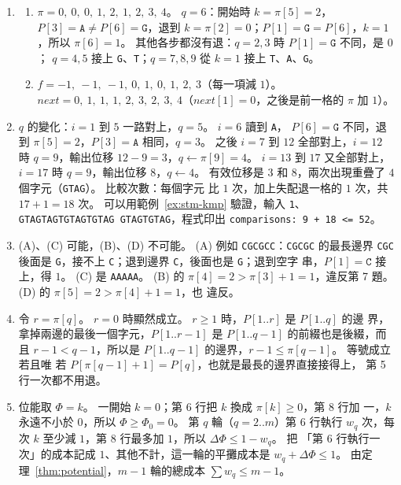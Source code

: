 \begin{enumerate}
\item
\begin{enumerate}
\item $\pi = 0,\ 0,\ 0,\ 1,\ 2,\ 1,\ 2,\ 3,\ 4$。 $q = 6$：開始時 $k = \pi[5] = 2$，$P[3] = \mathtt{A} \ne
P[6] = \mathtt{G}$，退到 $k = \pi[2] = 0$；$P[1] = \mathtt{G} = P[6]$，$k = 1$，所以
$\pi[6] = 1$。 其他各步都沒有退：$q = 2, 3$ 時 $P[1] = \mathtt{G}$ 不同，是 $0$；
$q = 4, 5$ 接上 \texttt{G}、\texttt{T}；$q = 7, 8, 9$ 從 $k = 1$ 接上
\texttt{T}、\texttt{A}、\texttt{G}。
\item $f = -1,\ -1,\ -1,\ 0,\ 1,\ 0,\ 1,\ 2,\ 3$（每一項減 $1$）。 $\mathit{next} = 0,\ 1,\ 1,\ 1,\ 2,\ 3,\ 2,\ 3,\ 4$（$\mathit{next}[1] =
0$，之後是前一格的 $\pi$ 加 $1$）。
\end{enumerate}

\item $q$ 的變化：$i = 1$ 到 $5$ 一路對上，$q = 5$。 $i = 6$ 讀到 \texttt{A}，
$P[6] = \mathtt{G}$ 不同，退到 $\pi[5] = 2$，$P[3] = \mathtt{A}$ 相同，$q = 3$。 之後
$i = 7$ 到 $12$ 全部對上，$i = 12$ 時 $q = 9$，輸出位移 $12 - 9 = 3$，$q \gets \pi[9]
= 4$。 $i = 13$ 到 $17$ 又全部對上，$i = 17$ 時 $q = 9$，輸出位移 $8$，$q \gets 4$。
有效位移是 $3$ 和 $8$，兩次出現重疊了 $4$ 個字元（\texttt{GTAG}）。 比較次數：每個字元
比 $1$ 次，加上失配退一格的 $1$ 次，共 $17 + 1 = 18$ 次。 可以用範例~\ref{ex:stm-kmp}
驗證，輸入 \texttt{1}、\texttt{GTAGTAGTGTAGTGTAG GTAGTGTAG}，程式印出
\texttt{comparisons: 9 + 18 <= 52}。

\item (A)、(C) 可能，(B)、(D) 不可能。 (A) 例如 \texttt{CGCGCC}：\texttt{CGCGC} 的最長邊界 \texttt{CGC} 後面是
\texttt{G}，接不上 \texttt{C}；退到邊界 \texttt{C}，後面也是 \texttt{G}；退到空字
串，$P[1] = \mathtt{C}$ 接上，得 $1$。 (C) 是 \texttt{AAAAA}。 (B) 的
$\pi[4] = 2 > \pi[3] + 1 = 1$，違反第 7 題。 (D) 的 $\pi[5] = 2 > \pi[4] + 1 = 1$，也
違反。

\item 令 $r = \pi[q]$。 $r = 0$ 時顯然成立。 $r \ge 1$ 時，$P[1..r]$ 是 $P[1..q]$ 的邊
界，拿掉兩邊的最後一個字元，$P[1..r - 1]$ 是 $P[1..q - 1]$ 的前綴也是後綴，而且
$r - 1 < q - 1$，所以是 $P[1..q - 1]$ 的邊界，$r - 1 \le \pi[q - 1]$。 等號成立若且唯
若 $P[\pi[q - 1] + 1] = P[q]$，也就是最長的邊界直接接得上， 第
5 行一次都不用退。

\item 位能取 $\Phi = k$。 一開始 $k = 0$；第 6 行把 $k$ 換成 $\pi[k] \ge 0$，第 8 行加
一，$k$ 永遠不小於 $0$，所以 $\Phi \ge \Phi_0 = 0$。 第 $q$ 輪（$q = 2..m$）第 6 行執行
$w_q$ 次，每次 $k$ 至少減 $1$，第 8 行最多加 $1$，所以 $\Delta\Phi \le 1 - w_q$。 把
「第 6 行執行一次」的成本記成 $1$、其他不計，這一輪的平攤成本是
$w_q + \Delta\Phi \le 1$。 由定理~\ref{thm:potential}，$m - 1$ 輪的總成本
$\sum w_q \le m - 1$。


\end{enumerate}
